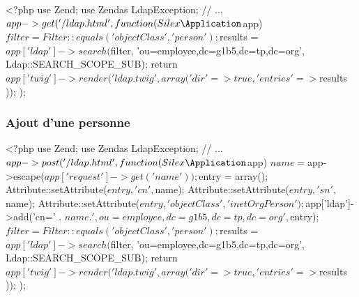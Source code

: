 \documentclass[11pt,a4paper]{report}
\begin{document}
                    \begin{phpcode}
                        <?php
                        use Zend\Ldap\Ldap;
                        use Zend\Ldap\Exception as LdapException;
                        // ...
                        $app->get('/ldap.html', function(Silex\Application $app) {
                            $filter = Filter::equals('objectClass', 'person');
                            $results = $app['ldap']->search($filter, 'ou=employee,dc=g1b5,dc=tp,dc=org',
                            Ldap::SEARCH_SCOPE_SUB);
                            return $app['twig']->render('ldap.twig', array(
                                'dir'       => true,
                                'entries'   => $results
                            ));
                        });
                    \end{phpcode}
                    
                \subsubsection{Ajout d'une personne}
                    
                    \begin{phpcode}
                        <?php
                        use Zend\Ldap\Ldap;
                        use Zend\Ldap\Exception as LdapException;
                        // ...
                        $app->post('/ldap.html', function(Silex\Application $app) {
                            $name = $app->escape($app['request']->get('name'));
                            $entry = array();
                            Attribute::setAttribute($entry, 'cn', $name);
                            Attribute::setAttribute($entry, 'sn', $name);
                            Attribute::setAttribute($entry, 'objectClass', 'inetOrgPerson');
                            $app['ldap']->add('cn=' . $name . ' ,ou=employee,dc=g1b5,dc=tp,dc=org', $entry);
                            $filter = Filter::equals('objectClass', 'person');
                            $results = $app['ldap']->search($filter, 'ou=employee,dc=g1b5,dc=tp,dc=org',
                            Ldap::SEARCH_SCOPE_SUB);
                            return $app['twig']->render('ldap.twig', array(
                                'dir'       => true,
                                'entries'   => $results
                            ));
                        });
                    \end{phpcode}
            
\end{document}
